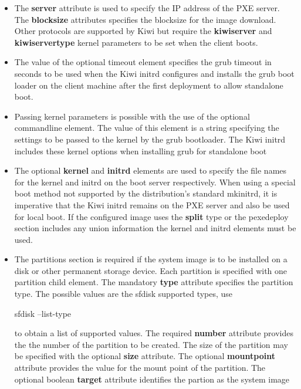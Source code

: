 \begin{itemize}
	\begin {itemize}
	\item The \textbf{server} attribute is used to specify the IP address
      of the PXE server. The \textbf{blocksize} attributes specifies the
      blocksize for the image download. Other protocols are supported by
      Kiwi but require the \textbf{kiwiserver} and \textbf{kiwiservertype}
      kernel parameters to be set when the client boots.
	\item The value of the optional timeout element specifies the grub
      timeout in seconds to be used when the Kiwi initrd configures and
      installs the grub boot loader on the client machine after the first
      deployment to allow standalone boot.
	\item Passing kernel parameters is possible with the use of the
      optional commandline element. The value of this element is a string
      specifying the settings to be passed to the kernel by the grub 
      bootloader. The Kiwi initrd includes these kernel options when 
      installing grub for standalone boot
	\item The optional \textbf{kernel} and \textbf{initrd} elements are
      used to specify the file names for the kernel and initrd on the boot
      server respectively. When using a special boot method not supported
      by the distribution's standard mkinitrd, it is imperative that the
      Kiwi initrd remains on the PXE server and also be used for local boot.
      If the configured image uses the \textbf{split} type or the pexedeploy
      section includes any union information the kernel and initrd elements
      must be used.
	\item The partitions section is required if the system image is to be
      installed on a disk or other permanent storage device. Each partition
      is specified with one partition child element. The mandatory
      \textbf{type} attribute specifies the partition type. The possible
      values are the sfdisk supported types, use
      \begin{Command}{14cm}
      sfdisk --list-type
      \end{Command}
      to obtain a list of supported values. The required \textbf{number}
      attribute provides the the number of the partition to be created. The
      size of the partition may be specified with the optional \textbf{size}
      attribute. The optional \textbf{mountpoint} attribute provides
      the value for the mount point of the partition. The optional boolean
      \textbf{target} attribute identifies the partion as the system image

\end{itemize}
\end{itemize}
